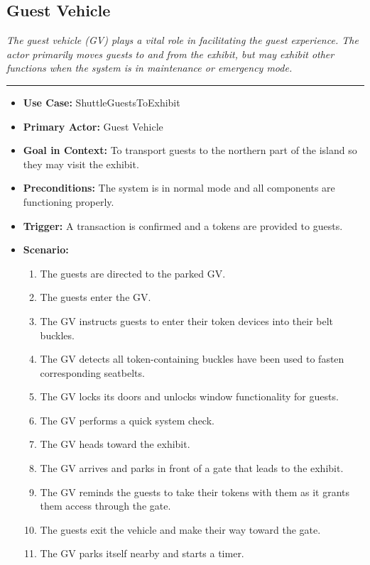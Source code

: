 \documentclass[12pt]{article}
\begin{document}
    \subsection{Guest Vehicle}
    \textit{The guest vehicle (GV) plays a vital role in facilitating the guest experience. The actor primarily
    moves guests to and from the exhibit, but may exhibit other functions when the system is in maintenance or
    emergency mode.}
    \par\noindent\rule{\textwidth}{0.4pt}    
    \begin{itemize}
        \item[]\textbf{Use Case:}                                
            ShuttleGuestsToExhibit

        \item[]\textbf{Primary Actor:}
            Guest Vehicle

        \item[]\textbf{Goal in Context:}
            To transport guests to the northern part of the island so they may 
            visit the exhibit.

        \item[]\textbf{Preconditions:}
            The system is in normal mode and all components are functioning properly.

        \item[]\textbf{Trigger:}
            A transaction is confirmed and a tokens are provided to guests.

        \item[]\textbf{Scenario:}
            \begin{enumerate}
                \item The guests are directed to the parked GV.
                \item The guests enter the GV.
                \item The GV instructs guests to enter their token devices into their belt buckles.
                \item The GV detects all token-containing buckles have been used to fasten corresponding seatbelts.
                \item The GV locks its doors and unlocks window functionality for guests.
                \item The GV performs a quick system check.
                \item The GV heads toward the exhibit.
                \item The GV arrives and parks in front of a gate that leads to the exhibit.
                \item The GV reminds the guests to take their tokens with them as it grants them access through the gate.
                \item The guests exit the vehicle and make their way toward the gate.
                \item The GV parks itself nearby and starts a timer.
            \end{enumerate}


\end{itemize}
\end{document}

